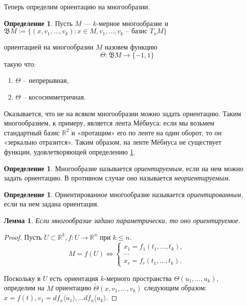 \documentclass[a5paper]{article}
\newcounter{through}
\theoremstyle{plain}
\newtheorem{lemma}[through]{Лемма}
\theoremstyle{definition}
\newtheorem{definition}[through]{Определение}
\numberwithin{through}{section}
\numberwithin{equation}{section}
\begin{document}
Теперь определим ориентацию на многообразии.
\begin{definition} \label{orient}
	Пусть $M$ --- $k$-мерное многообразие и
	$\mathfrak{B}M := \{ (x,v_1,\ldots,v_k): x \in M, v_1,\ldots,v_k \text{ -- базис } 
	T_x M\}$
\end{definition}
ориентацией на многообразии $M$ назовем функцию 
\[\Theta: \mathfrak{B}M \to \{-1,1\} \]
такую что:
\begin{enumerate}
	\item
	$\Theta$ -- непрерывная,
	
	\item
	$\Theta$ -- кососимметричная.
\end{enumerate}

Оказывается, что не на всяком многообразии можно задать ориентацию. 
Таким многообразием, к примеру, является лента Мёбиуса: 
если мы возьмем стандартный базис $\mathbb{R}^2$ и «протащим» 
его по ленте на один оборот, то он «зеркально отразится». 
Таким образом, на ленте Мёбиуса не существует функции, удовлетворяющей определению
\ref{orient}.

\begin{definition}
	Многообразие называется \textit{ориентируемым}, если на нем можно задать ориентацию.
	В противном случае оно называется \textit{неориентируемым}.
\end{definition}

\begin{definition}
	Ориентированное многообразие называется \textit{ориентированным},
	если на нем задана ориентация.
\end{definition}

\begin{lemma}
	Если многообразие задано параметрически, то оно ориентируемое.
\end{lemma}

\begin{proof}
	Пусть $U \subset \mathbb{R}^k, f: U \to \mathbb{R}^n$ при $k \leq n$.
	\begin{equation*}
		M = f(U) \iff
		\begin{cases}
		x_1 = f_1(t_1,\ldots,t_k), \\
		\ldots \\
		x_r = f_r(t_1,\ldots, t_k).
		\end{cases}
	\end{equation*}
	
	Поскольку в $U$ есть ориентация $k$-мерного пространства $\Theta (u_1,\ldots,u_k)$,
	определим на $M$ ориентацию $\tilde{\Theta}(x,v_1,\ldots,v_k)$ следующим образом:
	$x = f(t), v_1 =df_x \langle u_1 \rangle, \ldots df_x \langle u_k \rangle$.
\end{proof}
\end{document}
